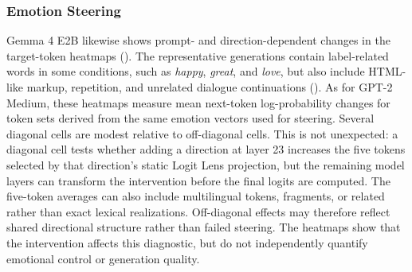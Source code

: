 \subsubsection{Emotion Steering}

Gemma 4 E2B likewise shows prompt- and direction-dependent changes in the target-token heatmaps (). 
The representative generations contain label-related words in some conditions, such as \emph{happy}, \emph{great}, and \emph{love}, 
but also include HTML-like markup, repetition, and unrelated dialogue continuations (). As for 
GPT-2 Medium, these heatmaps measure mean next-token log-probability changes for token sets derived from the same emotion 
vectors used for steering. Several diagonal cells are modest relative to off-diagonal cells. This is not unexpected: a diagonal cell 
tests whether adding a direction at layer 23 increases the five tokens selected by that direction's static Logit Lens projection, but 
the remaining model layers can transform the intervention before the final logits are computed. The five-token averages can also include 
multilingual tokens, fragments, or related rather than exact lexical realizations. Off-diagonal effects may therefore reflect shared 
directional structure rather than failed steering. The heatmaps show that the intervention affects this diagnostic, but do not independently 
quantify emotional control or generation quality.

